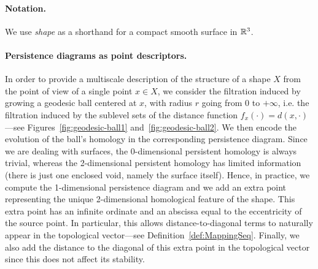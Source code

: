 \paragraph*{Notation.}
We use {\em shape} as a shorthand for a compact smooth surface in $\mathbb{R}^3$.

\paragraph*{Persistence diagrams as point descriptors.}
In order to provide a multiscale description of the structure of a shape $X$ from the 
point of view of a single point $x\in X$, 
we consider the filtration induced by growing a geodesic ball
centered at $x$, with radius $r$ going from $0$ to $+\infty$, i.e. the filtration induced by 
the sublevel sets of the distance function $f_x(\cdot)=d(x,\cdot)$---see
Figures~\ref{fig:geodesic-ball1} and~\ref{fig:geodesic-ball2}. We then encode the evolution of the ball's homology
in the corresponding persistence diagram.
Since we are dealing with surfaces, the 0-dimensional persistent homology is always trivial, whereas the 
2-dimensional persistent homology has
limited information (there is just one enclosed void, namely the surface itself).
Hence, in practice, we compute the 1-dimensional persistence diagram and we add an extra point
representing the unique 2-dimensional homological feature of the shape.
This extra point has an infinite ordinate and an abscissa equal to
the eccentricity of the source point.
In particular, this allows distance-to-diagonal terms to naturally appear
in the topological vector---see Definition~\ref{def:MappingSeq}. 
Finally, we also add  the distance to the diagonal 
of this extra point in the topological vector since 
this does not affect its stability.

